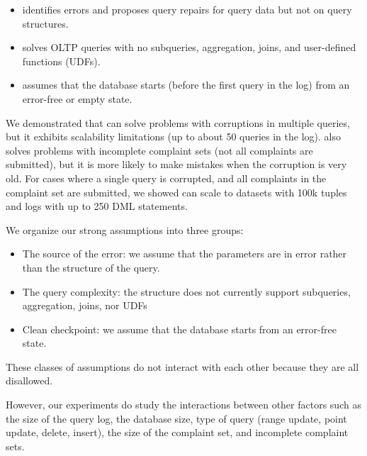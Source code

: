 \begin{itemize}
\item \sys identifies errors and proposes query repairs for query data but not on query structures.
\item \sys solves OLTP queries with no subqueries, aggregation, joins, and user-defined functions (UDFs).
\item \sys assumes that the database starts (before the first query in the log) from an error-free or empty state. 
\end{itemize}

We demonstrated that \sys can solve problems with corruptions in multiple queries, but it exhibits scalability limitations (up to about 50 queries in the log).  \sys also solves problems with incomplete
complaint sets (not all complaints are submitted), but it is more likely to make mistakes when the corruption is very old.  
For cases where a single query is corrupted, and all complaints in the complaint set are submitted, we showed \sys can scale to datasets with 100k tuples and logs with up to 250 DML statements.

\begin{quote}
\end{quote}


We organize our strong assumptions into three groups:
\begin{itemize}
\item The source of the error: we assume that the parameters are in error rather than the structure of the query.
\item The query complexity: the structure does not currently support subqueries, aggregation, joins, nor UDFs
\item Clean checkpoint: we assume that the database starts from an error-free state.
\end{itemize}
These classes of assumptions do not interact with each other because they are all disallowed.  

However, our experiments do study the interactions between other factors such as the size of the query log, the database size, type of query (range update, point update, delete, insert), the size of the complaint set, and incomplete complaint sets.



